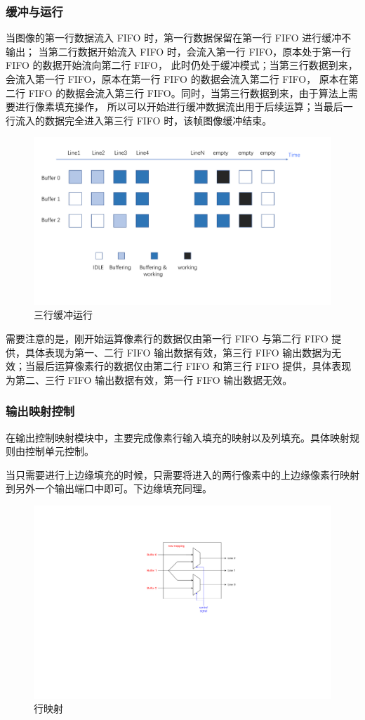 \documentclass[12pt, a4paper, oneside]{ctexbook}
\begin{document}
	\subsubsection{缓冲与运行}
	当图像的第一行数据流入 FIFO 时，第一行数据保留在第一行 FIFO 进行缓冲不输出；
	当第二行数据开始流入 FIFO 时，会流入第一行 FIFO，原本处于第一行 FIFO 的数据开始流向第二行 FIFO，
	此时仍处于缓冲模式；当第三行数据到来，会流入第一行 FIFO，原本在第一行 FIFO 的数据会流入第二行 FIFO，
	原本在第二行 FIFO 的数据会流入第三行 FIFO。同时，当第三行数据到来，由于算法上需要进行像素填充操作，
	所以可以开始进行缓冲数据流出用于后续运算；当最后一行流入的数据完全进入第三行 FIFO 时，该帧图像缓冲结束。
		\begin{figure}[h]
			\centering
			\includegraphics[scale=0.4]{pic/fifo_3_2.pdf}
			\caption{三行缓冲运行}
		\end{figure}
	\par 需要注意的是，刚开始运算像素行的数据仅由第一行 FIFO 与第二行 FIFO 提供，具体表现为第一、二行 FIFO 输出数据有效，第三行 FIFO 输出数据为无效；当最后运算像素行的数据仅由第二行 FIFO 和第三行 FIFO 提供，具体表现为第二、三行 FIFO 输出数据有效，第一行 FIFO 输出数据无效。
	\subsubsection{输出映射控制}
	在输出控制映射模块中，主要完成像素行输入填充的映射以及列填充。具体映射规则由控制单元控制。\par 当只需要进行上边缘填充的时候，只需要将进入的两行像素中的上边缘像素行映射到另外一个输出端口中即可。下边缘填充同理。
		\begin{figure}[h]
		\centering
		\includegraphics[scale=1]{pic/row_mapping.pdf}
		\caption{行映射}
		\end{figure}	
\end{document}
